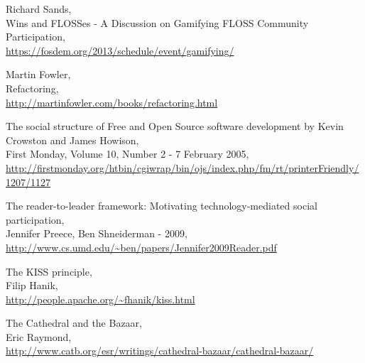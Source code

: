 \documentclass[11pt]{scrartcl}
\begin{document}
\begin{thebibliography}{9}
    Richard Sands,\\
    Wins and FLOSSes - A Discussion on Gamifying FLOSS Community Participation,\\    
    \url{https://fosdem.org/2013/schedule/event/gamifying/}

    Martin Fowler,\\
    Refactoring,\\
    \url{http://martinfowler.com/books/refactoring.html}

    The social structure of Free and Open Source software development by Kevin Crowston and James Howison,\\
    First Monday, Volume 10, Number 2 - 7 February 2005,\\
    \url{http://firstmonday.org/htbin/cgiwrap/bin/ojs/index.php/fm/rt/printerFriendly/1207/1127}
    
    The reader-to-leader framework: Motivating technology-mediated social participation,\\
    Jennifer Preece, Ben Shneiderman - 2009,\\
    \url{http://www.cs.umd.edu/~ben/papers/Jennifer2009Reader.pdf}

    The KISS principle,\\
    Filip Hanik,\\
    \url{http://people.apache.org/~fhanik/kiss.html}
    
    The Cathedral and the Bazaar,\\
    Eric Raymond,\\
    \url{http://www.catb.org/esr/writings/cathedral-bazaar/cathedral-bazaar/}
\end{thebibliography}
\end{document}
